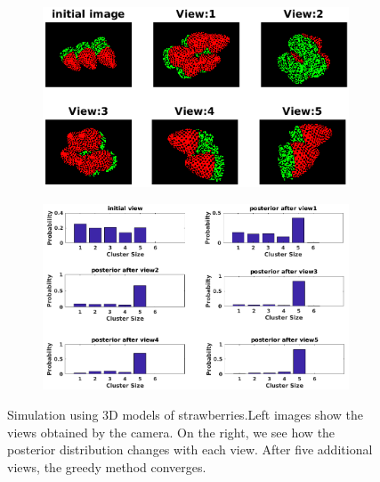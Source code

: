 \begin{figure}[htb]

\begin{subfigure}[t]{0.42\textwidth}
    \includegraphics[width=\textwidth]{figures/active_counting/strviewfin.png}
\end{subfigure}\quad \begin{subfigure}[t]{0.53\textwidth}
    \includegraphics[width=\textwidth]{figures/active_counting/strpostfin.png}\end{subfigure}
\caption[Simulation using 3D models of strawberries]{Simulation using 3D models of strawberries.Left images show the views obtained by the camera. On the right, we see how the posterior distribution changes with each view. After five additional views, the greedy method converges.}
\label{fig:sim3d}
\end{figure}

